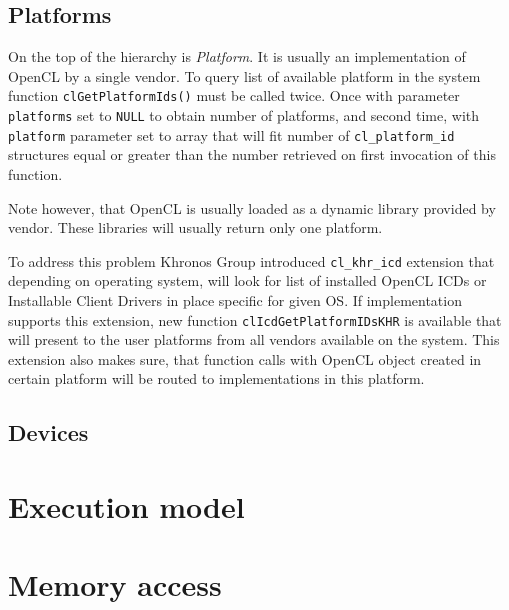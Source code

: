 \subsection{Platforms}

On the top of the hierarchy is \emph{Platform}. It is usually an implementation
of OpenCL by a single vendor. To query list of available platform in the system
function \texttt{clGetPlatformIds()} must be called twice. Once with parameter
\texttt{platforms} set to \texttt{NULL} to obtain number of platforms, and
second time, with \texttt{platform} parameter set to array that will fit
number of \texttt{cl\_platform\_id} structures equal or greater than the number
retrieved on first invocation of this function.

Note however, that OpenCL is usually loaded as a dynamic library provided by
vendor. These libraries will usually return only one platform.

To address this problem Khronos Group introduced \texttt{cl\_khr\_icd} extension
that depending on operating system, will look for list of installed OpenCL
ICDs or Installable Client Drivers in place specific for given OS. If
implementation supports this extension, new function \texttt{clIcdGetPlatformIDsKHR}
is available that will present to the user platforms from all vendors available
on the system. This extension also makes sure, that function calls with OpenCL
object created in certain platform will be routed to implementations in this
platform.

\subsection{Devices}



\section{Execution model}
\section{Memory access}
